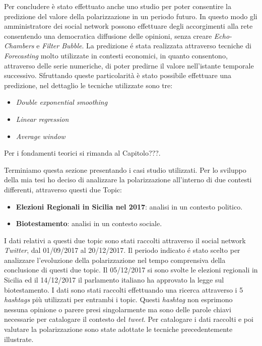 Per concludere è stato effettuato anche uno studio per poter consentire la predizione del valore della polarizzazione in un periodo futuro. In questo modo gli amministratore dei social network possono effettuare degli accorgimenti alla rete consentendo una democratica diffusione delle opinioni, senza creare \textit{Echo-Chambers} e \textit{Filter Bubble}.  
La predizione \'e stata realizzata attraverso tecniche di \textit{Forecasting} molto utilizzate in contesti economici, in quanto consentono, attraverso delle serie numeriche, di poter predirne il valore nell'istante temporale successivo. Sfruttando queste particolarità è stato possibile effettuare una predizione, nel dettaglio le tecniche utilizzate sono tre:
\begin{itemize}
\item \textit{Double exponential smoothing}
\item \textit{Linear regression}
\item \textit{Average window}
\end{itemize}
Per i fondamenti teorici si rimanda al Capitolo???.

Terminiamo questa sezione presentando i casi studio utilizzati. Per lo sviluppo della mia tesi ho deciso di analizzare  la polarizzazione all'interno di due contesti differenti, attraverso questi due Topic:
\begin{itemize}
\item \textbf{Elezioni Regionali in Sicilia nel 2017}: analisi in un contesto politico.
\item \textbf{Biotestamento}: analisi in un contesto sociale.
\end{itemize}
I dati relativi a questi due topic sono stati raccolti attraverso il social network \textit{Twitter}, dal 01/09/2017 al 20/12/2017. Il periodo indicato \'e stato scelto per analizzare l'evoluzione della polarizzazione nel tempo comprensiva della conclusione di questi due topic.
Il 05/12/2017 si sono svolte le elezioni regionali in Sicilia ed il 14/12/2017 il parlamento italiano ha approvato la legge sul biotestamento.
I dati sono stati raccolti effettuando una ricerca attraverso i 5 \textit{hashtags} più utilizzati per entrambi i topic. Questi \textit{hashtag} non esprimono nessuna opinione o parere presi singolarmente ma sono delle parole chiavi necessarie per catalogare il contesto del \textit{tweet}. Per catalogare i dati raccolti e poi valutare la polarizzazione sono state adottate le tecniche precedentemente illustrate.


